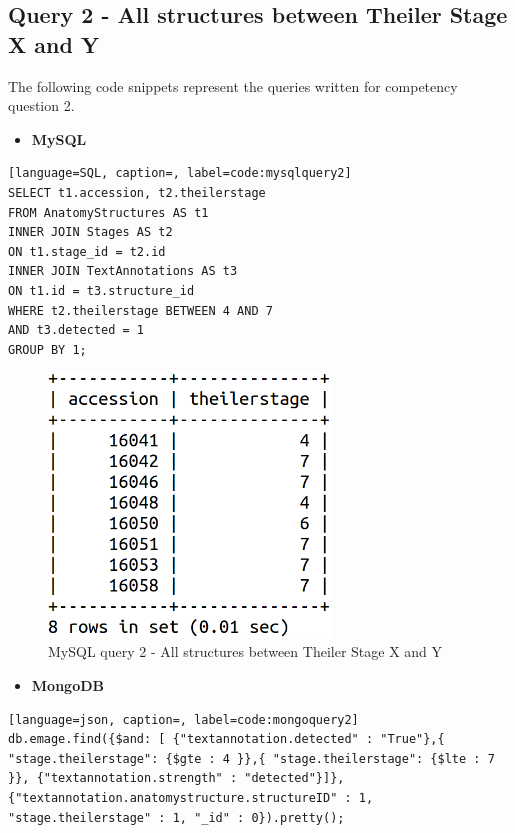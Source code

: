 \newpage
\subsection*{Query 2 - All structures between Theiler Stage X and Y}\label{query2}
The following code snippets represent the queries written for competency question 2.

\begin{itemize}[leftmargin=*]
\item \textbf{MySQL}
\end{itemize}

\begin{lstlisting}[language=SQL, caption=, label=code:mysqlquery2]
SELECT t1.accession, t2.theilerstage
FROM AnatomyStructures AS t1
INNER JOIN Stages AS t2
ON t1.stage_id = t2.id
INNER JOIN TextAnnotations AS t3
ON t1.id = t3.structure_id
WHERE t2.theilerstage BETWEEN 4 AND 7
AND t3.detected = 1
GROUP BY 1;
\end{lstlisting}

\begin{figure}[H]\begin{center}\includegraphics[height=7cm,width=0.4\linewidth]{images/mysqlquery2}\caption{MySQL query 2 - All structures between Theiler Stage X and Y}\label{fig:mysqlquery2}\end{center}\end{figure}

\begin{itemize}[leftmargin=*]
\item \textbf{MongoDB}
\end{itemize}

\begin{lstlisting}[language=json, caption=, label=code:mongoquery2]
db.emage.find({$and: [ {"textannotation.detected" : "True"},{ "stage.theilerstage": {$gte : 4 }},{ "stage.theilerstage": {$lte : 7 }}, {"textannotation.strength" : "detected"}]},{"textannotation.anatomystructure.structureID" : 1, "stage.theilerstage" : 1, "_id" : 0}).pretty();
\end{lstlisting}


